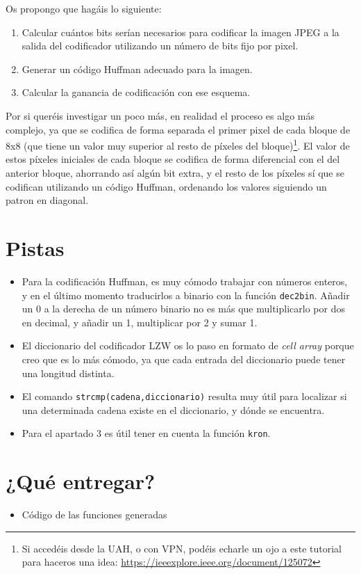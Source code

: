 \documentclass[es,practica]{uah}
\begin{document}
\begin{enumerate}
Os propongo que hagáis lo siguiente:

\begin{enumerate}
	\item Calcular cuántos bits serían necesarios para codificar la imagen JPEG a la salida del codificador utilizando un número de bits fijo por pixel. 
	\item Generar un código Huffman adecuado para la imagen.
	\item Calcular la ganancia de codificación con ese esquema.
\end{enumerate}

Por si queréis investigar un poco más, en realidad el proceso es algo más complejo, ya que se codifica de forma separada el primer pixel de cada bloque de 8x8 (que tiene un valor muy superior al resto de píxeles del bloque)\footnote{Si accedéis desde la UAH, o con VPN, podéis echarle un ojo a este tutorial para haceros una idea: \url{https://ieeexplore.ieee.org/document/125072}}. El valor de estos píxeles iniciales de cada bloque se codifica de forma diferencial con el del anterior bloque, ahorrando así algún bit extra, y el resto de los píxeles sí que se codifican utilizando un código Huffman, ordenando los valores siguiendo un patron en diagonal.


\section{Pistas}
\begin{itemize}
	\item Para la codificación Huffman, es muy cómodo trabajar con números enteros, y en el último momento traducirlos a binario con la función \texttt{dec2bin}. Añadir un 0 a la derecha de un número binario no es más que multiplicarlo por dos en decimal, y añadir un 1, multiplicar por 2 y sumar 1.
	\item El diccionario del codificador LZW os lo paso en formato de \emph{cell array} porque creo que es lo más cómodo, ya que cada entrada del diccionario puede tener una longitud distinta.
	\item El comando \texttt{strcmp(cadena,diccionario)} resulta muy útil para localizar si una determinada cadena existe en el diccionario, y dónde se encuentra.
	\item Para el apartado 3 es útil tener en cuenta la función \texttt{kron}.
\end{itemize}

\section{¿Qué entregar?}
\begin{itemize}
	\item Código de las funciones generadas
\end{itemize}


\end{enumerate}
\end{document}
